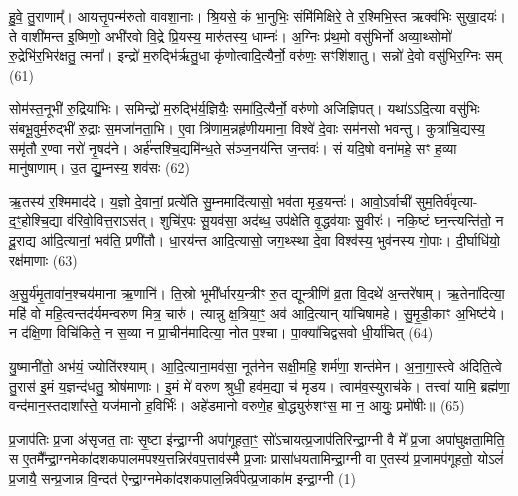हु॒वे॒ तु॒राणाम्᳚। आयत्तृ॒पन्म॑रुतो वावशा॒नाः। श्रि॒यसे॒ कं भा॒नुभिः॒ संमि॑मिक्षिरे॒ ते र॒श्मिभि॒स्त ऋक्व॑भिः सुखा॒दयः॑। ते वाशी॑मन्त इ॒ष्मिणो॒ अभी॑रवो वि॒द्रे प्रि॒यस्य॒ मारु॑तस्य॒ धाम्नः॑। अ॒ग्निः प्र॑थ॒मो वसु॑भिर्नो अव्या॒थ्सोमो॑ रु॒द्रेभि॑र॒भिर॑क्षतु॒ त्मना᳚। इन्द्रो॑ म॒रुद्भि॑र्\mbox{}ऋतु॒धा कृ॑णोत्वादि॒त्यैर्नो॒ वरु॑णः॒ सꣳशि॑शातु। सन्नो॑ दे॒वो वसु॑भिर॒ग्निः सम् (61)

सोम॑स्त॒नूभी॑ रु॒द्रिया॑भिः। समिन्द्रो॑ म॒रुद्भि॑र्य॒ज्ञियैः॒ समा॑दि॒त्यैर्नो॒ वरु॑णो अजिज्ञिपत्। यथा॑\-ऽ\-ऽदि॒त्या वसु॑भिः संबभू॒वुर्म॒रुद्भी॑ रु॒द्राः स॒मजा॑नता॒भि। ए॒वा त्रि॑णाम॒न्नहृ॑णीयमाना॒ विश्वे॑ दे॒वाः सम॑नसो भवन्तु। कुत्रा॑चि॒द्यस्य॒ समृ॑तौ र॒ण्वा नरो॑ नृ॒षद॑ने। अर्\mbox{}ह॑न्तश्चि॒द्यमि॑न्ध॒ते स॑ञ्ज॒नय॑न्ति ज॒न्तवः॑। सं यदि॒षो वना॑महे॒ सꣳ ह॒व्या मानु॑षाणाम्। उ॒त द्यु॒म्नस्य॒ शव॑सः (62)

ऋ॒तस्य॑ र॒श्मिमाद॑दे। य॒ज्ञो दे॒वानां॒ प्रत्ये॑ति सु॒म्नमादि॑त्यासो॒ भव॑ता मृड॒यन्तः॑। आवो॒\-ऽर्वाची॑ सुम॒तिर्व॑वृत्या- द॒ꣳ॒होश्चि॒द्या व॑रिवो॒वित्त॒रा\-ऽस॑त्। शुचि॑र॒पः सू॒यव॑सा॒ अद॑ब्ध॒ उप॑क्षेति वृ॒द्धव॑याः सु॒वीरः॑। नकि॒ष्टं घ्न॒न्त्यन्ति॑तो॒ न दू॒राद्य आ॑दि॒त्यानां॒ भव॑ति॒ प्रणी॑तौ। धा॒रय॑न्त आदि॒त्यासो॒ जग॒थ्स्था दे॒वा विश्व॑स्य॒ भुव॑नस्य गो॒पाः। दी॒र्घाधि॑यो॒ रक्ष॑माणाः (63)

अ॒सु॒र्य॑मृ॒तावा॑न॒श्चय॑माना ऋ॒णानि॑। ति॒स्रो भूमी᳚र्धारय॒न्त्रीꣳ रु॒त द्यून्त्रीणि॑ व्र॒ता वि॒दथे॑ अ॒न्तरे॑षाम्। ऋ॒तेना॑दित्या॒ महि॑ वो महि॒त्वन्तद॑र्यमन्वरुण मित्र॒ चारु॑। त्यान्नु क्ष॒त्रिया॒ꣳ॒ अव॑ आदि॒त्यान् या॑चिषामहे। सु॒मृ॒डी॒काꣳ अ॒भिष्ट॑ये। न द॑क्षि॒णा विचि॑किते॒ न स॒व्या न प्रा॒चीन॑मादित्या॒ नोत प॒श्चा। पा॒क्या॑चिद्वसवो धी॒र्या॑चित् (64)

यु॒ष्मानी॑तो॒ अभ॑यं॒ ज्योति॑रश्याम्। आ॒दि॒त्याना॒मव॑सा॒ नूत॑नेन सक्षी॒महि॒ शर्म॑णा॒ शन्त॑मेन। अ॒ना॒गा॒स्त्वे अ॑दिति॒त्वे तु॒रास॑ इ॒मं य॒ज्ञन्द॑धतु॒ श्रोष॑माणाः। इ॒मं मे॑ वरुण श्रुधी॒ हव॑म॒द्या च॑ मृडय। त्वाम॑व॒स्युराच॑के। तत्त्वा॑ यामि॒ ब्रह्म॑णा॒ वन्द॑मान॒स्तदाशा᳚स्ते॒ यज॑मानो ह॒विर्भिः॑। अहे॑डमानो वरुणे॒ह बो॒द्ध्युरु॑शꣳस॒ मा न॒ आयुः॒ प्रमो॑षीः॥ (65)


{\anuvakamend[{नामा॒ग्निः सꣳ शव॑सो॒ रक्ष॑माणा धी॒र्या॑चि॒देका॒न्नप॑ञ्चा॒शच्च॑॥11॥}]}

\setcounter{anuvakam}{0}
प्र॒जाप॑तिः प्र॒जा अ॑सृजत॒ ताः सृ॒ष्टा इ॑न्द्रा॒ग्नी अपा॑गूहता॒ꣳ॒ सो॑\-ऽचायत्प्र॒जाप॑तिरिन्द्रा॒ग्नी वै मे᳚ प्र॒जा अपा॑घुक्षता॒मिति॒ स ए॒तमै᳚न्द्रा॒ग्नमेका॑दशकपालमपश्य॒त्तन्निर॑वप॒त्ताव॑स्मै प्र॒जाः प्रासा॑धयतामिन्द्रा॒ग्नी वा ए॒तस्य॑ प्र॒जामप॑गूहतो॒ यो\-ऽलं॑ प्र॒जायै॒ सन्प्र॒जान्न वि॒न्दत॑ ऐन्द्रा॒ग्नमेका॑दशकपाल॒न्निर्व॑पेत्प्र॒जाका॑म इन्द्रा॒ग्नी (1)

